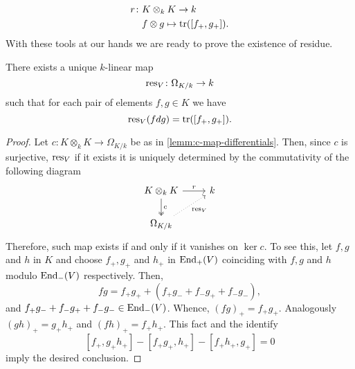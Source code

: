 \begin{align*}
	r\colon &K\otimes_{k} K \to k \\
	&f \otimes g \mapsto \operatorname{tr}([f_{+}, g_{+}]).
\end{align*}
With these tools at our hands we are ready to prove the existence of residue.
\begin{theorem}\label{thm:existence-of-residue}
	There exists a unique $k$-linear map
	\[
		\operatorname{res}_{V}\colon \Omega_{K/k}\to k
	\]
	such that for each pair of elements $f,g \in K$ we have
	\[
		\operatorname{res}_{V}(fdg) = \operatorname{tr}([f_{+}, g_{+}]).
	\]
\end{theorem}
\begin{proof}
	Let $c\colon K \otimes_{k} K \to \Omega_{K/k}$ be as in \cref{lemm:c-map-differentials}. Then, since $c$ is surjective, $\operatorname{res}_{V}$ if it exists it is uniquely determined by the commutativity of the following diagram
	\[
	\begin{tikzcd}
		K \otimes_{k} K \arrow[r, "r"] \arrow[d, two heads, "c"] & k \\
		\Omega_{K/k} \arrow[ur, dotted, swap, "\res_{V}"] &
	\end{tikzcd}
	\]
	Therefore, such map exists if and only if it vanishes on $\ker c$. To see this, let $f,g$ and $h$ in $K$ and choose $f_{+}, g_{+}$ and $h_{+}$ in $\operatorname{End}_{+}(V)$ coinciding with $f, g$ and $h$ modulo $\operatorname{End}_{-}(V)$ respectively. Then,
	\[
		fg = f_{+}g_{+} + (f_{+}g_{-} + f_{-}g_{+} + f_{-}g_{-}),
	\]
	and $f_{+}g_{-} + f_{-}g_{+} + f_{-}g_{-} \in \operatorname{End}_{-}(V)$. Whence, $(fg)_{+} = f_{+}g_{+}$. Analogously $(gh)_{+} = g_{+}h_{+}$ and $(fh)_{+} = f_{+}h_{+}$. This fact and the identify
	\[
		[f_{+},g_{+}h_{+}] - [f_{+}g_{+}, h_{+}] - [f_{+}h_{+}, g_{+}] = 0
	\]
	imply the desired conclusion.
\end{proof}
